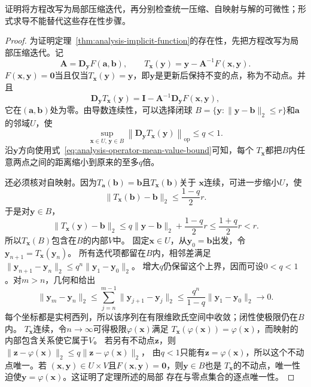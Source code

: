 证明将方程改写为局部压缩迭代，再分别检查统一压缩、自映射与解的可微性；形式求导不能替代这些存在性步骤。
\begin{proof}
为证明定理~\ref{thm:analysis-implicit-function}的存在性，先把方程改写为局部压缩迭代。记
\[   \bm{A}   =   \bm{D}_{\bm{y}}F(\bm{a},\bm{b}),   \qquad   T_{\bm{x}}(\bm{y})   =   \bm{y}-\bm{A}^{-1}F(\bm{x},\bm{y}). \]
$F(\bm{x},\bm{y})=\bm{0}$当且仅当$T_{\bm{x}}(\bm{y})=\bm{y}$，即$\bm y$是更新后保持不变的点，称为不动点。并且
\[   \bm{D}_{\bm{y}}T_{\bm{x}}(\bm{y})   =   \bm{I}   -   \bm{A}^{-1}\bm{D}_{\bm{y}}F(\bm{x},\bm{y}), \]
它在$(\bm{a},\bm{b})$处为零。由导数连续性，可以选择闭球 $B=\{\bm{y}:\lVert\bm{y}-\bm{b}\rVert_2\leq r\}$和$\bm{a}$的邻域$U$，使
\begin{equation}
  \sup_{\bm{x}\in U,\,\bm{y}\in B}
  \left\lVert
    \bm{D}_{\bm{y}}T_{\bm{x}}(\bm{y})
  \right\rVert_{\mathrm{op}}
  \leq q<1.
\label{eq:analysis-ift-uniform-contraction}
\end{equation}
沿$\bm{y}$方向使用式~\eqref{eq:analysis-operator-mean-value-bound}可知，每个
$T_{\bm{x}}$都把$B$内任意两点之间的距离缩小到原来的至多$q$倍。

还必须核对自映射。因为$T_{\bm{a}}(\bm{b})=\bm{b}$且$T_{\bm{x}}(\bm{b})$关于 $\bm{x}$连续，可进一步缩小$U$，使
\[   \lVert T_{\bm{x}}(\bm{b})-\bm{b}\rVert_2   \leq\frac{1-q}{2}r. \]
于是对$\bm{y}\in B$，
\[
  \lVert T_{\bm{x}}(\bm{y})-\bm{b}\rVert_2
  \leq
  q\lVert\bm{y}-\bm{b}\rVert_2+\frac{1-q}{2}r
  \leq
  \frac{1+q}{2}r
  <r.
\]
所以$T_{\bm{x}}(B)$包含在$B$的内部$V$中。
固定$\bm x\in U$，从$\bm y_0=\bm b$出发，令$\bm y_{n+1}=T_{\bm x}(\bm y_n)$。
所有迭代项都留在$B$内，相邻差满足
$\lVert\bm y_{n+1}-\bm y_n\rVert_2\leq q^n\lVert\bm y_1-\bm y_0\rVert_2$。
增大$q$仍保留这个上界，因而可设$0<q<1$。对$m>n$，几何和给出
\[
 \lVert\bm y_m-\bm y_n\rVert_2
 \leq\sum_{j=n}^{m-1}\lVert\bm y_{j+1}-\bm y_j\rVert_2
 \leq\frac{q^n}{1-q}\lVert\bm y_1-\bm y_0\rVert_2\longrightarrow0.
\]
每个坐标都是实柯西列，所以该序列在有限维欧氏空间中收敛；闭性使极限仍在$B$内。
$T_{\bm x}$连续，令$n\to\infty$可得极限$\varphi(\bm x)$满足
$T_{\bm x}(\varphi(\bm x))=\varphi(\bm x)$，而映射的内部包含关系使它属于$V$。
若另有不动点$\bm z$，则
$\lVert\bm z-\varphi(\bm x)\rVert_2\leq q\lVert\bm z-\varphi(\bm x)\rVert_2$，
由$q<1$只能有$\bm z=\varphi(\bm x)$，所以这个不动点唯一。若
$(\bm{x},\bm{y})\in U\times V$且$F(\bm{x},\bm{y})=\bm{0}$，则$\bm{y}\in B$也是
$T_{\bm{x}}$的不动点，唯一性迫使$\bm{y}=\varphi(\bm{x})$。这证明了定理所述的局部
存在与零点集合的逐点唯一性。


\end{proof}
